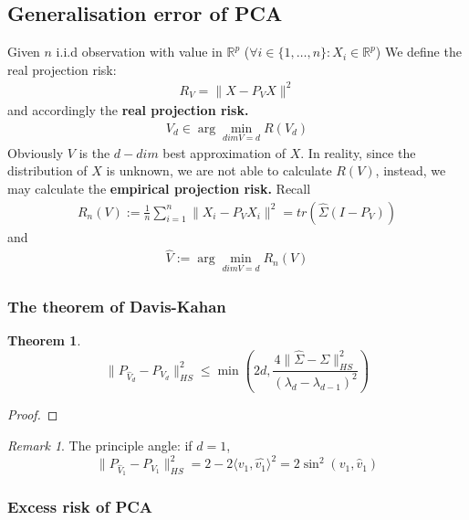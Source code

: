 \documentclass[a4paper,12pt, oneside, fleqn]{book}
\newtheorem{theorem}{Theorem}[section]
\theoremstyle{definition}
\theoremstyle{remark}
\newtheorem*{remark}{Remark}
\begin{document}
\subsection{Generalisation error of PCA}
Given $n$ i.i.d observation with value in $\mathbb{R}^p$ ($\forall i \in \{1, \dots, n \}: X_i \in \mathbb{R}^p$)  We define the real projection risk:
\begin{align*}
	R_V = \|X - P_V X \|^2
\end{align*}
and accordingly the \textbf{real projection risk.}
\begin{align*}
	V_d \in \arg\min_{dim V = d} R(V_d)
\end{align*}
Obviously $V$ is the $d-dim$ best approximation of $X$. In reality, since the distribution of $X$ is unknown, we are not able to calculate $R(V)$, instead, we may calculate the \textbf{empirical projection risk.} Recall
\begin{align*}
	R_n (V) := \frac{1}{n} \sum_{i = 1}^n \|X_i - P_V X_i\|^2 = tr(\hat{\Sigma}(I - P_V))
\end{align*}
and 
\begin{align*}
	\hat{V} := \arg\min_{dimV = d} R_n(V)
\end{align*}


\subsubsection*{The theorem of Davis-Kahan}


\begin{theorem}
	\begin{equation} \label{PCA: David-Kahan}
		\| P_{\hat{V}_d} - P_{V_d} \|_{HS}^2 \leq \min (2d, \frac{4 \| \hat{\Sigma} - \Sigma \|_{HS}^2}{(\lambda_d - \lambda_{d-1} )^2} )
	\end{equation}
\end{theorem}

\begin{proof}
\end{proof}

\begin{remark}
The principle angle: if $d = 1$, 
\begin{equation*}
	\| P_{\hat{V}_1} - P_{V_1} \|_{HS}^2 = 2 - 2 \langle v_1, \hat{v_1}  \rangle^2 = 2\sin^2(v_1, \hat{v}_1)
\end{equation*}	
\end{remark}

\subsubsection*{Excess risk of PCA}
\end{document}
